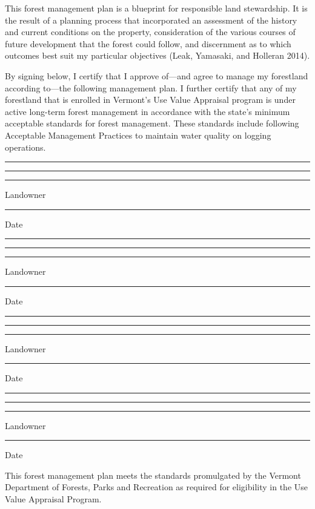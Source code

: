 \documentclass[]{tufte-handout}
\begin{document}
\vspace{30pt} \indent This forest management plan is a blueprint for
responsible land stewardship. It is the result of a planning process
that incorporated an assessment of the history and current conditions on
the property, consideration of the various courses of future development
that the forest could follow, and discernment as to which outcomes best
suit my particular objectives (Leak, Yamasaki, and Holleran 2014).

\vspace{5pt} By signing below, I certify that I approve of---and agree
to manage my forestland according to---the following management plan. I
further certify that any of my forestland that is enrolled in Vermont's
Use Value Appraisal program is under active long-term forest management
in accordance with the state's minimum acceptable standards for forest
management. These standards include following Acceptable Management
Practices to maintain water quality on logging operations.

\vspace{38pt}

\noindent\rule{9cm}{0.4pt} \rule{.3cm}{0pt} \rule{4cm}{0.4pt}

\noindent Landowner \rule{7.7cm}{0pt} Date

\vspace{18pt}

\noindent\rule{9cm}{0.4pt} \rule{.3cm}{0pt} \rule{4cm}{0.4pt}

\noindent Landowner \rule{7.7cm}{0pt} Date

\vspace{18pt}

\noindent\rule{9cm}{0.4pt} \rule{.3cm}{0pt} \rule{4cm}{0.4pt}

\noindent Landowner \rule{7.7cm}{0pt} Date

\vspace{18pt}

\noindent\rule{9cm}{0.4pt} \rule{.3cm}{0pt} \rule{4cm}{0.4pt}

\noindent Landowner \rule{7.7cm}{0pt} Date

\vspace{24pt}

This forest management plan meets the standards promulgated by the
Vermont Department of Forests, Parks and Recreation as required for
eligibility in the Use Value Appraisal Program.

\vspace{22pt}
\end{document}
